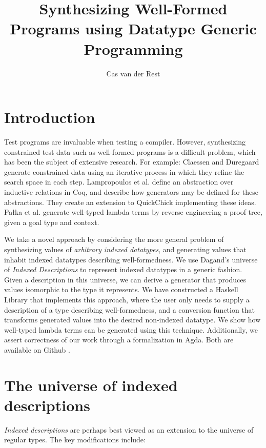 \documentclass[acmsmall, nonacm]{acmart}
\title{Synthesizing Well-Formed Programs using Datatype Generic Programming}
\author{Cas van der Rest}
\affiliation{
\institution{Utrecht University}
\country{The Netherlands}
}
\begin{document}
\maketitle

  \section*{Introduction}

  Test programs are invaluable when testing a compiler. However, synthesizing constrained test data such as well-formed programs is a difficult problem, which has been the subject of extensive research. For example: Claessen and Duregaard \cite{claessen2015generating} generate constrained data using an iterative process in which they refine the search space in each step. Lampropoulos et al. define an abstraction over inductive relations in Coq, and describe how generators may be defined for these abstractions. They create an extension to QuickChick \cite{denes2014quickchick} implementing these ideas. Pa{\l}ka et al. \cite{palka2011testing} generate well-typed lambda terms by reverse engineering a proof tree, given a goal type and context.

  We take a novel approach by considering the more general problem of synthesizing values of \emph{arbitrary indexed datatypes}, and generating values that inhabit indexed datatypes describing well-formedness. We use Dagand's universe of \emph{Indexed Descriptions} \cite{dagand2013cosmology} to represent indexed datatypes in a generic fashion. Given a description in this universe, we can derive a generator that produces values isomorphic to the type it represents. We have constructed a Haskell Library that implements this approach, where the user only needs to supply a description of a type describing well-formedness, and a conversion function that transforms generated values into the desired non-indexed datatype. We show how well-typed lambda terms can be generated using this technique. Additionally, we assert correctness of our work through a formalization in Agda. Both are available on Github \cite{github}.

  \vspace{-0.1cm}
  \section*{The universe of indexed descriptions}

  \emph{Indexed descriptions} \cite{dagand2013cosmology} are perhaps best viewed as an extension to the universe of regular types. The key modifications include: 
\end{document}
